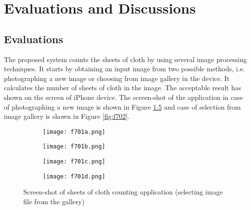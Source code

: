 
\chapter{Evaluations and Discussions} %

\label{Chapter7} %



\section{Evaluations}

The proposed system counts the sheets of cloth by using several image processing techniques. It starts by obtaining an input image from two possible methods, i.e. photographing a new image or choosing from image gallery in the device. It calculates the number of sheets of cloth in the image. The acceptable result has shown on the screen of iPhone device. The screen-shot of the application in case of photographing a new image is shown in Figure \ref{fig:701} and case of selection from image gallery is shown in Figure \ref{fig:f702}.
\begin{figure}[t]
	\centering
	\begin{subfigure}[b]{0.2\textwidth}
		\texttt{[image: f701a.png]}
		\caption{}\label{fig:f701a}
	\end{subfigure}
	\begin{subfigure}[b]{0.2\textwidth}
		\texttt{[image: f701b.png]}
		\caption{}\label{fig:f701b}
	\end{subfigure}
	\begin{subfigure}[b]{0.2\textwidth}
		\texttt{[image: f701c.png]}
		\caption{}\label{fig:f701c}
	\end{subfigure}
	\begin{subfigure}[b]{0.2\textwidth}
		\texttt{[image: f701d.png]}
		\caption{}\label{fig:f701d}
	\end{subfigure}
	\caption{Screen-shot of sheets of cloth counting application (selecting image file from the gallery)}
	\label{fig:701}
\end{figure}

